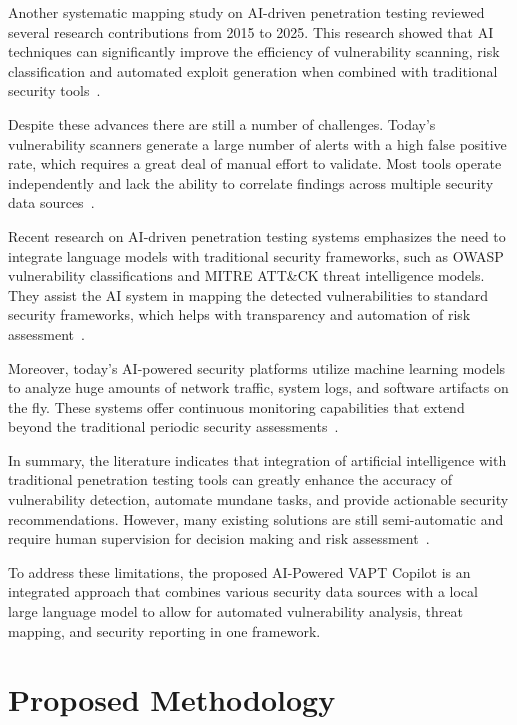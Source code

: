 \documentclass[runningheads]{llncs}
\begin{document}
Another systematic mapping study on AI-driven penetration testing reviewed several research contributions from 2015 to 2025. This research showed that AI techniques can significantly improve the efficiency of vulnerability scanning, risk classification and automated exploit generation when combined with traditional security tools~\cite{kumar2024ai}.

Despite these advances there are still a number of challenges. Today’s vulnerability scanners generate a large number of alerts with a high false positive rate, which requires a great deal of manual effort to validate. Most tools operate independently and lack the ability to correlate findings across multiple security data sources~\cite{johnson2021automated,mcgraw2006software}.

Recent research on AI-driven penetration testing systems emphasizes the need to integrate language models with traditional security frameworks, such as OWASP vulnerability classifications and MITRE ATT\&CK threat intelligence models. They assist the AI system in mapping the detected vulnerabilities to standard security frameworks, which helps with transparency and automation of risk assessment~\cite{zhang2024iris}.

Moreover, today’s AI-powered security platforms utilize machine learning models to analyze huge amounts of network traffic, system logs, and software artifacts on the fly. These systems offer continuous monitoring capabilities that extend beyond the traditional periodic security assessments~\cite{provos2003hide}.

In summary, the literature indicates that integration of artificial intelligence with traditional penetration testing tools can greatly enhance the accuracy of vulnerability detection, automate mundane tasks, and provide actionable security recommendations. However, many existing solutions are still semi-automatic and require human supervision for decision making and risk assessment~\cite{mahmoud2018network,petrovski2025mapping}.

To address these limitations, the proposed AI-Powered VAPT Copilot is an integrated approach that combines various security data sources with a local large language model to allow for automated vulnerability analysis, threat mapping, and security reporting in one framework.

\section{Proposed Methodology}
\end{document}
